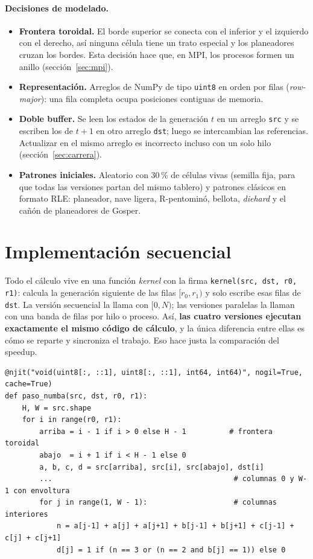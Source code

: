 \documentclass[11pt,a4paper]{article}
\newcommand{\code}[1]{\texttt{#1}}
\begin{document}
\paragraph{Decisiones de modelado.}
\begin{itemize}
  \item \textbf{Frontera toroidal.} El borde superior se conecta con el inferior y el izquierdo con el
        derecho, así ninguna célula tiene un trato especial y los planeadores cruzan los bordes. Esta
        decisión hace que, en MPI, los procesos formen un anillo (sección~\ref{sec:mpi}).
  \item \textbf{Representación.} Arreglos de NumPy de tipo \code{uint8} en orden por filas (\emph{row-major}):
        una fila completa ocupa posiciones contiguas de memoria.
  \item \textbf{Doble buffer.} Se leen los estados de la generación $t$ en un arreglo \code{src} y se
        escriben los de $t+1$ en otro arreglo \code{dst}; luego se intercambian las referencias.
        Actualizar en el mismo arreglo es incorrecto incluso con un solo hilo (sección~\ref{sec:carrera}).
  \item \textbf{Patrones iniciales.} Aleatorio con 30\,\% de células vivas (semilla fija, para que todas las
        versiones partan del mismo tablero) y patrones clásicos en formato RLE: planeador, nave ligera,
        R-pentominó, bellota, \emph{diehard} y el cañón de planeadores de Gosper.
\end{itemize}

\section{Implementación secuencial}\label{sec:secuencial}

Todo el cálculo vive en una función \emph{kernel} con la firma \code{kernel(src, dst, r0, r1)}: calcula la
generación siguiente de las filas $[r_0, r_1)$ y solo escribe esas filas de \code{dst}. La versión
secuencial la llama con $[0, N)$; las versiones paralelas la llaman con una banda de filas por hilo o proceso.
Así, \textbf{las cuatro versiones ejecutan exactamente el mismo código de cálculo}, y la única diferencia
entre ellas es cómo se reparte y sincroniza el trabajo. Eso hace justa la comparación del speedup.

\begin{lstlisting}[caption={Kernel (extracto de \code{vida/kernels.py}).},label={lst:kernel}]
@njit("void(uint8[:, ::1], uint8[:, ::1], int64, int64)", nogil=True, cache=True)
def paso_numba(src, dst, r0, r1):
    H, W = src.shape
    for i in range(r0, r1):
        arriba = i - 1 if i > 0 else H - 1          # frontera toroidal
        abajo  = i + 1 if i < H - 1 else 0
        a, b, c, d = src[arriba], src[i], src[abajo], dst[i]
        ...                                          # columnas 0 y W-1 con envoltura
        for j in range(1, W - 1):                    # columnas interiores
            n = a[j-1] + a[j] + a[j+1] + b[j-1] + b[j+1] + c[j-1] + c[j] + c[j+1]
            d[j] = 1 if (n == 3 or (n == 2 and b[j] == 1)) else 0
\end{lstlisting}
\end{document}
